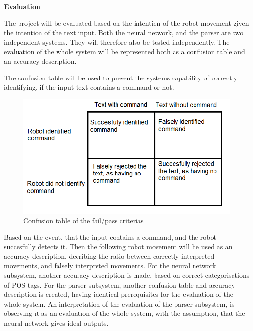 \textbf{\Large{Evaluation}}

The project will be evaluated based on the intention of the robot 
movement given the intention of the text input. Both the 
neural network, and the parser are two independent systems. 
They will therefore also be tested independently.
The evaluation of the whole system will be represented both as 
a confusion table and an accuracy description.

The confusion table will be used to present the systems 
capability of correctly identifying, if the input text contains a
command or not.
\begin{figure}[h]
    \centering
    \includegraphics[width=15cm]{img/Confusion_table.png}
    \caption{Confusion table of the fail/pass criterias}
    \label{Confusion}
\end{figure}
Based on the event, that the input contains a command, and the 
robot succesfully detects it. 
Then the following robot movement will be used as 
an accuracy description, decribing the ratio between correctly interpreted movements, 
and falsely interpreted movements. 
For the neural network subsystem, another accuracy description is made, based 
on correct categorisations of POS tags. 
For the parser subsystem, another confusion table and accuracy description is created, 
having identical prerequisites for the evaluation of the whole system.
An interpretation of the evaluation of the parser subsystem, is observing it as 
an evaluation of the whole system, with the assumption, 
that the neural network gives ideal outputs.



